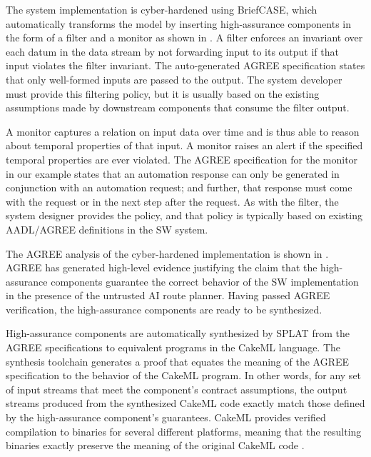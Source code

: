 The system implementation is cyber-hardened using BriefCASE, which automatically transforms the model by inserting high-assurance components in the form of a filter and a monitor as shown in .
A filter enforces an invariant over each datum in the data stream by not forwarding input to its output if that input violates the filter invariant.
The auto-generated AGREE specification states that only well-formed inputs are passed to the output.
The system developer must provide this filtering policy, but it is usually based on the existing assumptions made by downstream components that consume the filter output.

A monitor captures a relation on input data over time and is thus able to reason about temporal properties of that input.
A monitor raises an alert if the specified temporal properties are ever violated.
The AGREE specification for the monitor in our example states that an automation response can only be generated in conjunction with an automation request; and further, that response must come with the request or in the next step after the request.
As with the filter, the system designer provides the policy, and that policy is typically based on existing AADL/AGREE definitions in the SW system.

The AGREE analysis of the cyber-hardened implementation is shown in
. AGREE has generated high-level
evidence justifying the claim that the high-assurance components
guarantee the correct behavior of the SW implementation in the
presence of the untrusted AI route planner.  Having passed AGREE
verification, the high-assurance components are ready to be
synthesized.

High-assurance components are automatically synthesized by SPLAT from
the AGREE specifications to equivalent programs in the CakeML
language.  The synthesis toolchain generates a proof that equates the
meaning of the AGREE specification to the behavior of the CakeML
program.  In other words, for any set of input streams that meet the
component's contract assumptions, the output streams produced from the
synthesized CakeML code exactly match those defined by the
high-assurance component's guarantees.  CakeML provides verified
compilation to binaries for several different platforms, meaning that
the resulting binaries exactly preserve the meaning of the original
CakeML code \cite{cakeml}.

